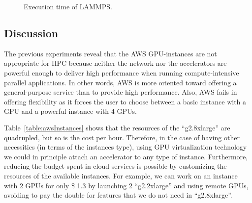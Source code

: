 \documentclass[a4paper,twoside]{article}
\begin{document}
\begin{figure}[htb]
\centering
{}
\quad
{}
\caption{Execution time of LAMMPS.}
\label{fig:lammps}
\end{figure}

\subsection{Discussion}
The previous experiments reveal that the AWS GPU-instances are not appropriate for HPC
because neither the network nor the accelerators are powerful enough to deliver high performance
when running compute-intensive parallel applications. 
In other words, AWS is more oriented toward offering a general-purpose service than to provide high performance.
Also, AWS fails in offering flexibility as it forces the user to choose between a basic instance with a GPU and a powerful instance with 4 GPUs.

Table~\ref{table:awsInstances} shows that the resources of the ``g2.8xlarge'' are quadrupled, but so is the cost per hour.
Therefore, in the case of having other necessities (in terms of the instances type), using GPU virtualization technology we could in principle attach an accelerator to any type of instance.
Furthermore, reducing the budget spent in cloud services is possible by customizing the resources of the available instances.
For example, we can work on an instance with 2 GPUs for only \$ 1.3 by launching 2 ``g2.2xlarge'' and using remote GPUs, avoiding to pay the double for features that we do not need in ``g2.8xlarge''.
\end{document}
